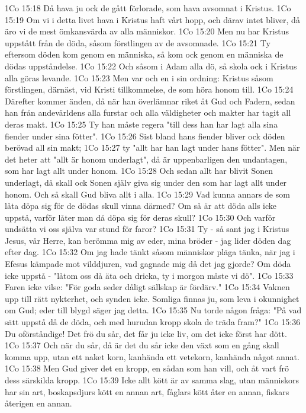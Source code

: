 1Co 15:18  Då hava ju ock de gått förlorade, som hava avsomnat i Kristus.
1Co 15:19  Om vi i detta livet hava i Kristus haft vårt hopp, och därav intet bliver, då äro vi de mest ömkansvärda av alla människor.
1Co 15:20  Men nu har Kristus uppstått från de döda, såsom förstlingen av de avsomnade.
1Co 15:21  Ty eftersom döden kom genom en människa, så kom ock genom en människa de dödas uppståndelse.
1Co 15:22  Och såsom i Adam alla dö, så skola ock i Kristus alla göras levande.
1Co 15:23  Men var och en i sin ordning: Kristus såsom förstlingen, därnäst, vid Kristi tillkommelse, de som höra honom till.
1Co 15:24  Därefter kommer änden, då när han överlämnar riket åt Gud och Fadern, sedan han från andevärldens alla furstar och alla väldigheter och makter har tagit all deras makt.
1Co 15:25  Ty han måste regera "till dess han har lagt alla sina fiender under sina fötter".
1Co 15:26  Sist bland hans fiender bliver ock döden berövad all sin makt;
1Co 15:27  ty "allt har han lagt under hans fötter". Men när det heter att "allt är honom underlagt", då är uppenbarligen den undantagen, som har lagt allt under honom.
1Co 15:28  Och sedan allt har blivit Sonen underlagt, då skall ock Sonen själv giva sig under den som har lagt allt under honom. Och så skall Gud bliva allt i alla.
1Co 15:29  Vad kunna annars de som låta döpa sig för de dödas skull vinna därmed? Om så är att döda alls icke uppstå, varför låter man då döpa sig för deras skull?
1Co 15:30  Och varför undsätta vi oss själva var stund för faror?
1Co 15:31  Ty - så sant jag i Kristus Jesus, vår Herre, kan berömma mig av eder, mina bröder - jag lider döden dag efter dag.
1Co 15:32  Om jag hade tänkt såsom människor pläga tänka, när jag i Efesus kämpade mot vilddjuren, vad gagnade mig då det jag gjorde? Om döda icke uppstå - "låtom oss då äta och dricka, ty i morgon måste vi dö".
1Co 15:33  Faren icke vilse: "För goda seder dåligt sällskap är fördärv."
1Co 15:34  Vaknen upp till rätt nykterhet, och synden icke. Somliga finnas ju, som leva i okunnighet om Gud; eder till blygd säger jag detta.
1Co 15:35  Nu torde någon fråga: "På vad sätt uppstå då de döda, och med hurudan kropp skola de träda fram?"
1Co 15:36  Du oförståndige! Det frö du sår, det får ju icke liv, om det icke först har dött.
1Co 15:37  Och när du sår, då är det du sår icke den växt som en gång skall komma upp, utan ett naket korn, kanhända ett vetekorn, kanhända något annat.
1Co 15:38  Men Gud giver det en kropp, en sådan som han vill, och åt vart frö dess särskilda kropp.
1Co 15:39  Icke allt kött är av samma slag, utan människors har sin art, boskapsdjurs kött en annan art, fåglars kött åter en annan, fiskars återigen en annan.
